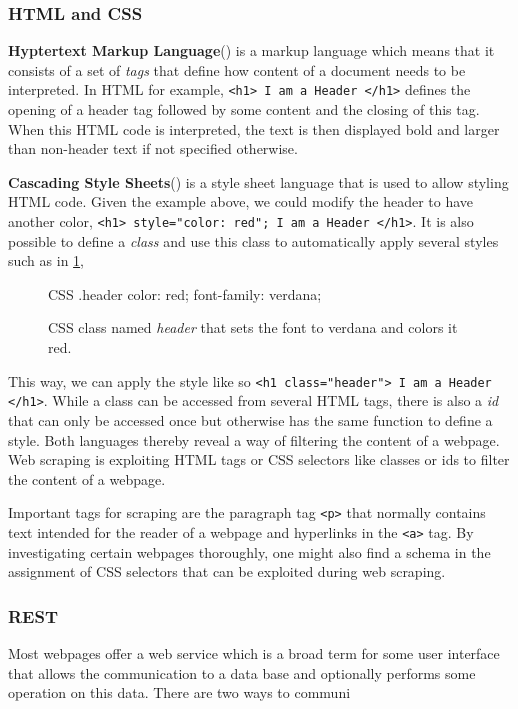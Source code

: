 \subsubsection{HTML and CSS}

\textbf{Hyptertext Markup Language}() is a markup language which means that it consists of a set of \textsl{tags} that define how content of a document needs to be interpreted. In HTML for example, \texttt{<h1> I am a Header </h1>} defines the opening of a header tag followed by some content and the closing of this tag. When this HTML code is interpreted, the text is then displayed bold and larger than non-header text if not specified otherwise.

\textbf{Cascading Style Sheets}() is a style sheet language that is used to allow styling HTML code. Given the example above, we could modify the header to have another color, \texttt{<h1> style="color: red"; I am a Header </h1>}. It is also possible to define a \emph{class} and use this class to automatically apply several styles such as in \ref{lst:css},\renewcommand{\figurename}{Listing}

\begin{figure}[h]
  \centering
  \begin{cminted}{CSS}
    .header {
      color: red;
      font-family: verdana;
    }
  \end{cminted}
  \caption{CSS class named \emph{header} that sets the font to verdana and colors it red.}
  \label{lst:css}

\end{figure}

This way, we can apply the style like so \texttt{<h1 class="header"> I am a Header </h1>}. While a class can be accessed from several HTML tags, there is also a \textsl{id} that can only be accessed once but otherwise has the same function to define a style.
Both languages thereby reveal a way of filtering the content of a webpage. Web scraping is exploiting HTML tags or CSS selectors like classes or ids to filter the content of a webpage.

Important tags for scraping are the paragraph tag \texttt{<p>} that normally contains text intended for the reader of a webpage and hyperlinks in the \texttt{<a>} tag. By investigating certain webpages thoroughly, one might also find a schema in the assignment of CSS selectors that can be exploited during web scraping.

\subsubsection{REST}
Most webpages offer a web service which is a broad term for some user interface that allows the communication to a data base and optionally performs some operation on this data. There are two ways to communi
